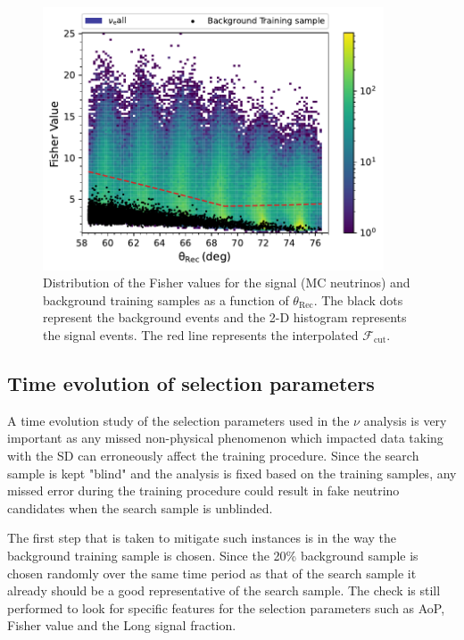 \begin{figure}[t!]
  \centering
  \includegraphics[width=0.9\textwidth]{thesis_figures/Nu_analysis/Fisher_plots/Fisher_comp_bkg_sim_wnt.pdf}
  \caption{Distribution of the Fisher values for the signal (MC neutrinos) and background training samples as a function of $\theta_{\text{Rec}}$. The black dots represent the background events and the 2-D histogram represents the signal events. The red line represents the interpolated $\mathcal{F}_{\text{cut}}$.}
  \label{fig:Fish_bkg_sig}
\end{figure}
\subsection{Time evolution of selection parameters}
\label{subsec:nu_sel_timeev}

A time evolution study of the selection parameters used in the $\nu$ analysis is very important as any missed non-physical phenomenon which impacted data taking with the SD can erroneously affect the training procedure. Since the search sample is kept "blind" and the analysis is fixed based on the training samples, any missed error during the training procedure could result in fake neutrino candidates when the search sample is unblinded. 

The first step that is taken to mitigate such instances is in the way the background training sample is chosen. Since the 20\% background sample is chosen randomly over the same time period as that of the search sample it already should be a good representative of the search sample. The check is still performed to look for specific features for the selection parameters such as AoP, Fisher value and the Long signal fraction. 

